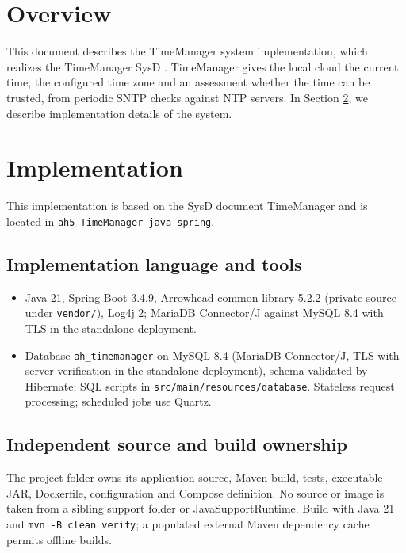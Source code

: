 \documentclass[a4paper]{arrowhead}
\begin{document}
\section{Overview}
\label{sec:overview}

This document describes the TimeManager system implementation, which realizes the TimeManager SysD \cite{tim-sysd}. TimeManager gives the local cloud the current time, the configured time zone and an assessment whether the time can be trusted, from periodic SNTP checks against NTP servers.
In Section \ref{Implementation}, we describe implementation details of the system.

\newpage

\section{Implementation}
\label{Implementation}

This implementation is based on the SysD document TimeManager \cite{tim-sysd} and is located in \texttt{ah5-TimeManager-java-spring}.

\subsection{Implementation language and tools}
\begin{itemize}
\item Java 21, Spring Boot 3.4.9, Arrowhead common library 5.2.2 (private source under \texttt{vendor/}), Log4j 2; MariaDB Connector/J against MySQL 8.4 with TLS in the standalone deployment.
\item Database \texttt{ah\_\allowbreak{}timemanager} on MySQL 8.4 (MariaDB Connector/J, TLS with server verification in the standalone deployment), schema validated by Hibernate; SQL scripts in \texttt{src/\allowbreak{}main/\allowbreak{}resources/\allowbreak{}database}. Stateless request processing; scheduled jobs use Quartz.
\end{itemize}

\subsection{Independent source and build ownership}
The project folder owns its application source, Maven build, tests, executable JAR, Dockerfile, configuration and Compose definition. No source or image is taken from a sibling support folder or JavaSupportRuntime. Build with Java 21 and \texttt{mvn -B clean verify}; a populated external Maven dependency cache permits offline builds.
\end{document}
